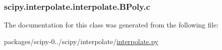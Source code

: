 \subsubsection[{c}]{\setlength{\rightskip}{0pt plus 5cm}scipy.\+interpolate.\+interpolate.\+B\+Poly.\+c}\label{classscipy_1_1interpolate_1_1interpolate_1_1BPoly_a3adf7285134e6b463b179f10df120786}


The documentation for this class was generated from the following file\+:\begin{DoxyCompactItemize}
\item 
packages/scipy-\/0../scipy/interpolate/\hyperlink{interpolate_8py}{interpolate.\+py}\end{DoxyCompactItemize}
